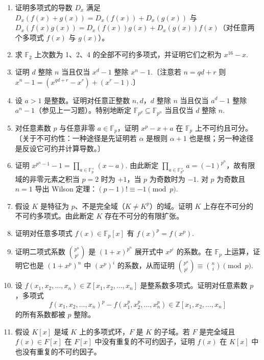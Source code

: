 \begin{enumerate}
\item 证明多项式的导数 \(D_x\) 满足 \(D_x(f(x)+g(x)) = D_x(f(x))+D_x(g(x))\) 与 \(D_x(f(x)g(x)) = D_x(f(x))g(x)+D_x(g(x))f(x)\)（对任意两个多项式 \(f(x)\) 与 \(g(x)\)）。

\item 求 \(\mathbb{F}_2\) 上次数为 1、2、4 的全部不可约多项式，并证明它们之积为 \(x^{16}-x\).

\item 证明 \(d\) 整除 \(n\) 当且仅当 \(x^d-1\) 整除 \(x^n-1\).〔注意若 \(n = qd+r\) 则 \(x^n-1 = (x^{qd+r}-x^r)+(x^r-1)\).〕

\item 设 \(a > 1\) 是整数。证明对任意正整数 \(n, d\)，\(d\) 整除 \(n\) 当且仅当 \(a^d-1\) 整除 \(a^n-1\)（参见上一习题）。特别地断定 \(\mathbb{F}_{p^d} \subseteq \mathbb{F}_{p^n}\) 当且仅当 \(d\) 整除 \(n\).

\item 对任意素数 \(p\) 与任意非零 \(a \in \mathbb{F}_p\)，证明 \(x^p-x+a\) 在 \(\mathbb{F}_p\) 上不可约且可分。〔关于不可约性：一种途径是先证明若 \(\alpha\) 是根则 \(\alpha+1\) 也是根；另一种途径是反设它可约并计算导数。〕

\item 证明 \(x^{p^n-1}-1 = \prod_{a \in \mathbb{F}_p^{\times}}(x-a)\). 由此断定 \(\prod_{a \in \mathbb{F}_{p^n}^\times}a = (-1)^{p^n}\)，故有限域的非零元素之积当 \(p = 2\) 时为 \(+1\)，当 \(p\) 为奇数时为 \(-1\). 对 \(p\) 为奇数且 \(n = 1\) 导出 Wilson 定理：\((p-1)! \equiv -1 \pmod p\).

\item 假设 \(K\) 是特征为 \(p\)、不是完全域（\(K \neq K^p\)）的域。证明 \(K\) 上存在不可分的不可约多项式。由此断定 \(K\) 存在不可分的有限扩张。

\item 证明对任意多项式 \(f(x) \in \mathbb{F}_p[x]\) 有 \(f(x)^p = f(x^p)\).

\item 证明二项式系数 \(\binom{p^n}{p^i}\) 是 \((1+x)^{p^n}\) 展开式中 \(x^{p^i}\) 的系数。在 \(\mathbb{F}_p\) 上运算，证明它也是 \((1+x^p)^n\) 中 \((x^p)^i\) 的系数，从而证明 \(\binom{p^n}{p^i} \equiv \binom{n}{i} \pmod p\).

\item 设 \(f(x_1, x_2, \ldots, x_n) \in \mathbb{Z}[x_1, x_2, \ldots, x_n]\) 是整系数多项式。证明对任意素数 \(p\)，多项式
\[
f(x_1, x_2, \ldots, x_n)^p-f(x_1^p, x_2^p, \ldots, x_n^p) \in \mathbb{Z}[x_1, x_2, \ldots, x_n]
\]
的所有系数都被 \(p\) 整除。

\item 假设 \(K[x]\) 是域 \(K\) 上的多项式环，\(F\) 是 \(K\) 的子域。若 \(F\) 是完全域且 \(f(x) \in F[x]\) 在 \(F[x]\) 中没有重复的不可约因子，证明 \(f(x)\) 在 \(K[x]\) 中也没有重复的不可约因子。
\end{enumerate}

